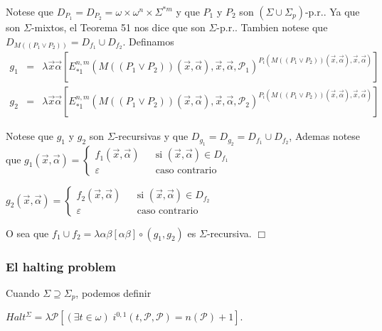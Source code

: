 Notese que \(D_{P_{1}}=D_{P_{2}}=\omega \times \omega ^{n}\times \Sigma ^{\ast m}\) y que \(P_{1}\) y \(P_{2}\) son \((\Sigma \cup \Sigma _{p})\)-p.r.. Ya que son \(\Sigma \)-mixtos, el Teorema 51 nos dice que son \( \Sigma \)-p.r.. Tambien notese que \(D_{M((P_{1}\vee P_{2}))}=D_{f_{1}}\cup D_{f_{2}}\). Definamos
\(\displaystyle \begin{array}{rcl} g_{1} & =& \lambda \vec{x}\vec{\alpha}\left[ E_{\ast 1}^{n,m}(M\left( (P_{1}\vee P_{2})\right) (\vec{x},\vec{\alpha}),\vec{x},\vec{\alpha}, \mathcal{P}_{1})^{P_{i}(M\left( (P_{1}\vee P_{2})\right) (\vec{x},\vec{\alpha }),\vec{x},\vec{\alpha})}\right] \\ g_{2} & =& \lambda \vec{x}\vec{\alpha}\left[ E_{\ast 1}^{n,m}(M\left( (P_{1}\vee P_{2})\right) (\vec{x},\vec{\alpha}),\vec{x},\vec{\alpha}, \mathcal{P}_{2})^{P_{i}(M\left( (P_{1}\vee P_{2})\right) (\vec{x},\vec{\alpha }),\vec{x},\vec{\alpha})}\right] \end{array} \)

Notese que \(g_{1}\) y \(g_{2}\) son \(\Sigma \)-recursivas y que \( D_{g_{1}}=D_{g_{2}}=D_{f_{1}}\cup D_{f_{2}}\), Ademas notese que
\(\displaystyle g_{1}(\vec{x},\vec{\alpha})=\left\{ \begin{array}{lll} f_{1}(\vec{x},\vec{\alpha}) & & \text{si }(\vec{x},\vec{\alpha})\in D_{f_{1}} \\ \varepsilon & & \text{caso contrario} \end{array} \right. \)

\(\displaystyle g_{2}(\vec{x},\vec{\alpha})=\left\{ \begin{array}{lll} f_{2}(\vec{x},\vec{\alpha}) & & \text{si }(\vec{x},\vec{\alpha})\in D_{f_{2}} \\ \varepsilon & & \text{caso contrario} \end{array} \right. \)

O sea que \(f_{1}\cup f_{2}=\lambda \alpha \beta \left[ \alpha \beta \right] \circ (g_{1},g_{2})\) es \(\Sigma \)-recursiva. \(\Box\)

\subsubsection{El halting problem}

Cuando \(\Sigma \supseteq \Sigma _{p}\), podemos definir

\(\displaystyle Halt^{\Sigma }=\lambda \mathcal{P}\left[ (\exists t\in \omega )\;i^{0,1}(t, \mathcal{P},\mathcal{P})=n(\mathcal{P})+1\right] \text{.} \)

